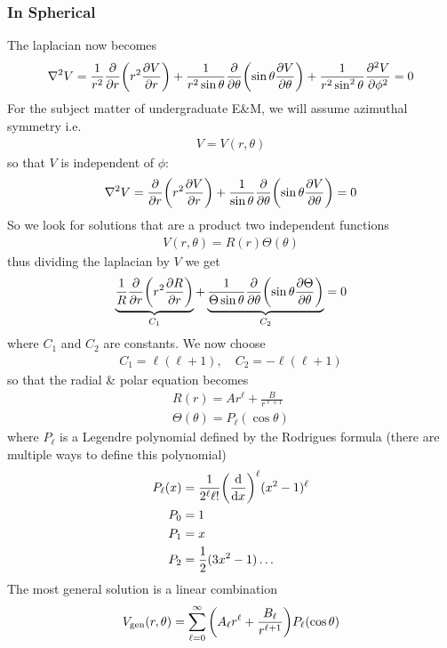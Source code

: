 \documentclass[../main.tex]{subfiles}
\begin{document}
\subsubsection{In Spherical}
The laplacian now becomes
\begin{align*}
    \laplacian V = \frac{1}{r^2} \pdv{r}(r^2 \pdv{V}{r}) 
        + \frac{1}{r^2 \sin\theta} \pdv{\theta} (\sin\theta \pdv{V}{\theta})
        + \frac{1}{r^2 \sin^2\theta} \pdv[2]{V}{\phi} = 0
\end{align*}
For the subject matter of undergraduate E\&M, we will assume azimuthal symmetry i.e.
\begin{align*}
    V = V(r, \theta)
\end{align*}
so that $V$ is independent of $\phi$:
\begin{align*}
    \laplacian V = \pdv{r} (r^2 \pdv{V}{r}) + \frac{1}{\sin\theta} \pdv{\theta} (\sin\theta \pdv{V}{\theta}) = 0
\end{align*}
So we look for solutions that are a product two independent functions
\begin{align*}
    V(r, \theta) = R(r) \Theta(\theta)
\end{align*}
thus dividing the laplacian by $V$ we get
\begin{align*}
    \underbrace{
        \frac{1}{R} \pdv{r} (r^2 \pdv{R}{r})
    }_{C_1} 
    + \underbrace{
        \frac{1}{\Theta \sin\theta} \pdv{\theta} (\sin\theta \pdv{\Theta}{\theta}) 
    }_{C_2} = 0
\end{align*}
where $C_1$ and $C_2$ are constants. We now choose
\begin{align*}
    C_1 = \ell (\ell +1), \quad C_2 = -\ell (\ell + 1)
\end{align*}
so that the radial \& polar equation becomes
\begin{align*}
    R(r) = A r^\ell + \frac{B}{r^{\ell + 1}} \\
    \Theta(\theta) = P_\ell(\cos\theta)
\end{align*}
where $P_\ell$ is a Legendre polynomial defined by the Rodrigues formula (there are multiple ways to define this polynomial)
\begin{align*}
    P_\ell(x) &= \frac{1}{2^\ell \ell!} \qt(\dv{x})^\ell (x^2 - 1)^\ell \\
    P_0 &= 1 \\
    P_1 &= x \\
    P_2 &= \frac{1}{2}(3x^2 - 1)\dots
\end{align*}
The most general solution is a linear combination
\begin{align*}
    V_{\text{gen}}(r, \theta) = \sum_{\ell = 0}^\infty \qt(A_\ell r^\ell + \frac{B_\ell}{r^{\ell + 1}}) P_\ell(\cos\theta)
\end{align*}
\end{document}
